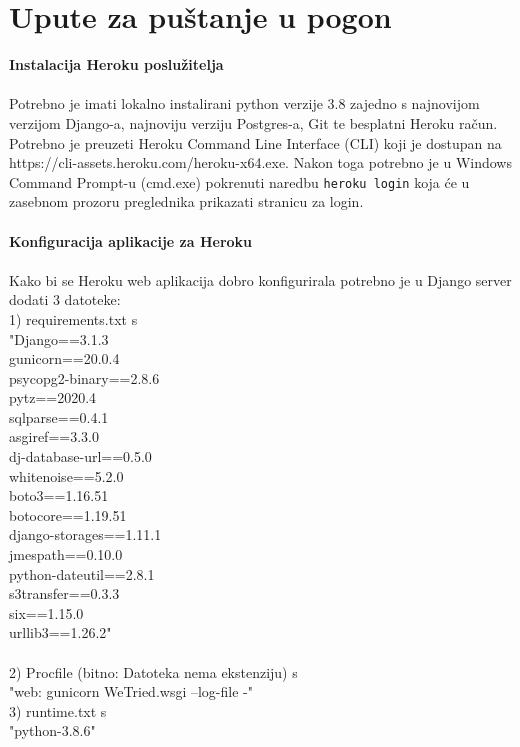{		\section{Upute za puštanje u pogon}
			\textbf{Instalacija Heroku poslužitelja}\\
			\\
			Potrebno je imati lokalno instalirani python verzije 3.8
			zajedno s najnovijom verzijom Django-a, najnoviju verziju Postgres-a, Git te besplatni Heroku račun.
			Potrebno je preuzeti Heroku Command Line Interface (CLI) koji je dostupan na https://cli-assets.heroku.com/heroku-x64.exe.
			Nakon toga potrebno je u Windows Command Prompt-u (cmd.exe) pokrenuti
			naredbu \verb|heroku login| koja će u zasebnom prozoru preglednika prikazati stranicu za login. \\
			\\
			\textbf{Konfiguracija aplikacije za Heroku}\\
			\\
			Kako bi se Heroku web aplikacija dobro konfigurirala potrebno je u
			Django server dodati 3 datoteke: \\
			1) requirements.txt s \\
			"Django==3.1.3 \\
			gunicorn==20.0.4 \\
			psycopg2-binary==2.8.6 \\
			pytz==2020.4 \\
			sqlparse==0.4.1 \\
			asgiref==3.3.0 \\
			dj-database-url==0.5.0 \\
			whitenoise==5.2.0 \\
			boto3==1.16.51 \\
			botocore==1.19.51 \\
			django-storages==1.11.1 \\
			jmespath==0.10.0 \\
			python-dateutil==2.8.1 \\
			s3transfer==0.3.3 \\
			six==1.15.0 \\
			urllib3==1.26.2" \\
			\\
			2) Procfile (bitno: Datoteka nema ekstenziju) s \\
			"web: gunicorn WeTried.wsgi --log-file -"
			\\
			3) runtime.txt s \\
			"python-3.8.6" \\
}
